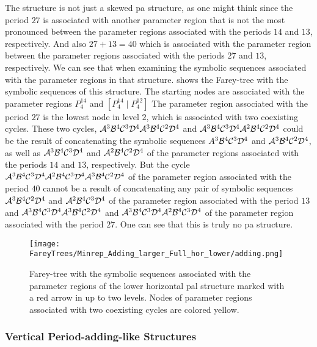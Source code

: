 The structure is not just a skewed \gls{pa} structure, as one might think since the period $27$ is associated with another parameter region that is not the most pronounced between the parameter regions associated with the periods $14$ and $13$, respectively.
And also $27 + 13 = 40$ which is associated with the parameter region between the parameter regions associated with the periods $27$ and $13$, respectively.
We can see that when examining the symbolic sequences associated with the parameter regions in that structure.
 shows the Farey-tree with the symbolic sequences of this structure.
The starting nodes are associated with the parameter regions $P^{14}_4$ and $\left[P^{14}_4 \mid P^{12}_4\right]$
The parameter region associated with the period $27$ is the lowest node in level $2$, which is associated with two coexisting cycles.
These two cycles, $\mathcal{A}^3\mathcal{B}^4\mathcal{C}^3\mathcal{D}^4\mathcal{A}^3\mathcal{B}^4\mathcal{C}^2\mathcal{D}^4$ and $\mathcal{A}^3\mathcal{B}^4\mathcal{C}^3\mathcal{D}^4\mathcal{A}^2\mathcal{B}^4\mathcal{C}^2\mathcal{D}^4$ could be the result of concatenating the symbolic sequences $A^3\mathcal{B}^4\mathcal{C}^3\mathcal{D}^4$ and $\mathcal{A}^3\mathcal{B}^4\mathcal{C}^2\mathcal{D}^4$, as well as $\mathcal{A}^3\mathcal{B}^4\mathcal{C}^3\mathcal{D}^4$ and $\mathcal{A}^2\mathcal{B}^4\mathcal{C}^2\mathcal{D}^4$ of the parameter regions associated with the periods $14$ and $13$, respectively.
But the cycle $\mathcal{A}^3\mathcal{B}^4\mathcal{C}^3\mathcal{D}^4\mathcal{A}^2\mathcal{B}^4\mathcal{C}^3\mathcal{D}^4\mathcal{A}^3\mathcal{B}^4\mathcal{C}^2\mathcal{D}^4$ of the parameter region associated with the period $40$ cannot be a result of concatenating any pair of symbolic sequences $\mathcal{A}^3\mathcal{B}^4\mathcal{C}^2\mathcal{D}^4$ and $\mathcal{A}^2\mathcal{B}^4\mathcal{C}^3\mathcal{D}^4$ of the parameter region associated with the period $13$ and $\mathcal{A}^3\mathcal{B}^4\mathcal{C}^3\mathcal{D}^4\mathcal{A}^3\mathcal{B}^4\mathcal{C}^2\mathcal{D}^4$ and $\mathcal{A}^3\mathcal{B}^4\mathcal{C}^3\mathcal{D}^4\mathcal{A}^2\mathcal{B}^4\mathcal{C}^3\mathcal{D}^4$ of the parameter region associated with the period $27$.
One can see that this is truly no \gls{pa} structure.

\begin{figure}
	\centering
	\texttt{[image: FareyTrees/Minrep\_Adding\_larger\_Full\_hor\_lower/adding.png]}
	\caption[Farey-tree with the symbolic sequences of a horizontal  structure]{
		Farey-tree with the symbolic sequences associated with the parameter regions of the lower horizontal \gls{pal} structure marked with a red arrow in  up to two levels.
		Nodes of parameter regions associated with two coexisting cycles are colored yellow.
	}
	\label{fig:add.add.like.hor.tree}
\end{figure}

\subsubsection{Vertical Period-adding-like Structures}

